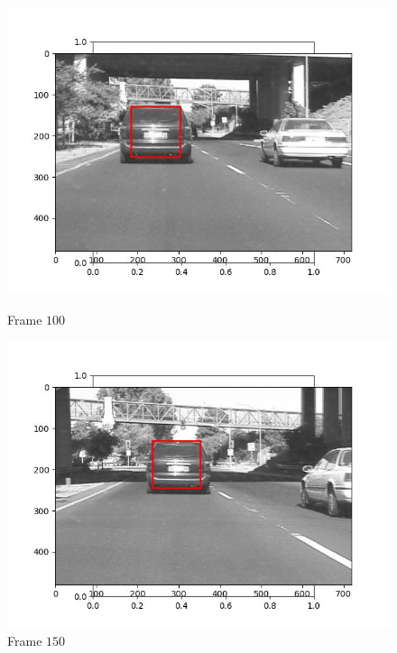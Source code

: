 \begin{figure}[H]
\begin{minipage}{.49\textwidth}
    \includegraphics[width=\textwidth]{./figures/lk_affine/car1/frame000100.jpg}
    \caption{Frame $100$}
  \end{minipage}
  \begin{minipage}{.49\textwidth}
    \centering
    \includegraphics[width=\textwidth]{./figures/lk_affine/car1/frame000150.jpg}
    \caption{Frame $150$}
  \end{minipage}
  \hfill
  \begin{minipage}{.49\textwidth}
    \centering

\end{minipage}
\end{figure}
